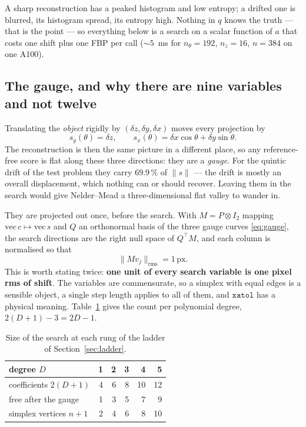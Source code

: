 \documentclass[11pt,a4paper]{article}
\newcommand{\px}{\,\text{px}}
\begin{document}
A sharp reconstruction has a peaked histogram and low entropy; a drifted one
is blurred, its histogram spread, its entropy high.  Nothing in $q$ knows the
truth --- that is the point --- so everything below is a search on a scalar
function of $a$ that costs one shift plus one FBP per call ($\sim5$~ms for
$n_\theta=192$, $n_z=16$, $n=384$ on one A100).

\subsection{The gauge, and why there are nine variables and not twelve}
\label{sec:gauge}

Translating the \emph{object} rigidly by $(\delta z,\delta y,\delta x)$ moves
every projection by
\begin{equation}
  s_y(\theta)=\delta z,\qquad
  s_x(\theta)=\delta x\cos\theta+\delta y\sin\theta .
  \label{eq:gauge}
\end{equation}
The reconstruction is then the same picture in a different place, so any
reference-free score is flat along these three directions: they are a
\emph{gauge}.  For the quintic drift of the test problem they carry
$69.9\,\%$ of $\lVert s\rVert$ --- the drift is mostly an overall
displacement, which nothing can or should recover.  Leaving them in the search
would give Nelder--Mead a three-dimensional flat valley to wander in.

They are projected out once, before the search.  With
$M=P\otimes I_2$ mapping $\mathrm{vec}\,c\mapsto\mathrm{vec}\,s$ and $Q$ an
orthonormal basis of the three gauge curves \eqref{eq:gauge}, the search
directions are the right null space of $Q^{\!\top}\!M$, and each column is
normalised so that
\begin{equation}
  \lVert M v_j\rVert_{\text{rms}} = 1 \px .
  \label{eq:units}
\end{equation}
This is worth stating twice: \textbf{one unit of every search variable is one
pixel rms of shift}.  The variables are commensurate, so a simplex with equal
edges is a sensible object, a single step length applies to all of them, and
$\mathtt{xatol}$ has a physical meaning.  Table~\ref{tab:free} gives the count
per polynomial degree, $2(D+1)-3=2D-1$.

\begin{table}[htb]
\centering
\begin{tabular}{lrrrrr}
\toprule
degree $D$ & 1 & 2 & 3 & 4 & 5 \\
\midrule
coefficients $2(D+1)$ & 4 & 6 & 8 & 10 & 12 \\
free after the gauge  & 1 & 3 & 5 & 7 & 9 \\
simplex vertices $n+1$& 2 & 4 & 6 & 8 & 10 \\
\bottomrule
\end{tabular}
\caption{Size of the search at each rung of the ladder of
Section~\ref{sec:ladder}.}
\label{tab:free}
\end{table}
\end{document}
